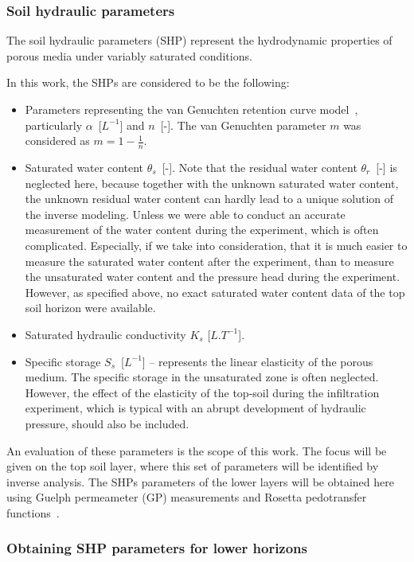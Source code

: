 \documentclass[review]{myarticle}
\begin{document}
\subsubsection{Soil hydraulic parameters}
\label{shp}

The soil hydraulic parameters (SHP) represent the hydrodynamic properties of porous media under variably saturated conditions.

In this work, the SHPs are considered to be the following:

\begin{itemize}
\item Parameters representing the van Genuchten retention curve model~\citep{vangenuchten}, particularly $\alpha$~[$L^{-1}$]  and $n$~[-]. The van Genuchten parameter $m$ was considered as $m=1-\frac{1}{n}$. 
\item Saturated water content $\theta_s$~[-]. Note that the residual water content $\theta_r$~[-] is neglected here, because together with the unknown saturated water content, the unknown residual water content can hardly lead to a unique solution of the inverse modeling. Unless we were able to conduct an accurate measurement of the water content during the experiment, which is often complicated. Especially, if we take into consideration, that it is much easier to measure the saturated water content after the experiment, than to measure the unsaturated water content and the pressure head during the experiment. However, as specified above, no exact saturated water content data of the top soil horizon were available.
\item Saturated hydraulic conductivity $K_s$ [$L.T^{-1}$]. 
\item Specific storage $S_s$~[$L^{-1}$] -- represents the linear elasticity of the porous medium. The specific storage in the unsaturated zone is often neglected. However, the effect of the elasticity of the top-soil during the infiltration experiment, which is typical with an abrupt development of hydraulic pressure, should also be included.
\end{itemize}

An evaluation of these parameters is the scope of this work. The focus will be given on the top soil layer, where this set of parameters will be identified  by  inverse analysis. The SHPs parameters of the lower layers will be obtained here using Guelph permeameter (GP) measurements and Rosetta pedotransfer functions~\citep{Schaap}.


\subsubsection{Obtaining SHP parameters for lower horizons}
\label{dolni}
\end{document}
